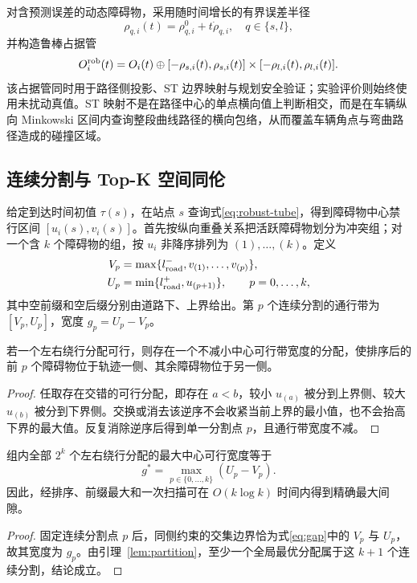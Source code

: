 对含预测误差的动态障碍物，采用随时间增长的有界误差半径
\begin{equation}
 \rho_{q,i}(t)=\rho_{q,i}^{0}+t\dot\rho_{q,i},\quad q\in\{s,l\},
\end{equation}
并构造鲁棒占据管
\begin{equation}
 O_i^{\rm rob}(t)=O_i(t)\oplus
 [-\rho_{s,i}(t),\rho_{s,i}(t)]\times[-\rho_{l,i}(t),\rho_{l,i}(t)].
 \label{eq:robust-tube}
\end{equation}
该占据管同时用于路径侧投影、ST 边界映射与规划安全验证；实验评价则始终使用未扰动真值。ST 映射不是在路径中心的单点横向值上判断相交，而是在车辆纵向 Minkowski 区间内查询整段曲线路径的横向包络，从而覆盖车辆角点与弯曲路径造成的碰撞区域。

\subsection{连续分割与 Top-K 空间同伦}

给定到达时间初值 $\tau(s)$，在站点 $s$ 查询式\eqref{eq:robust-tube}，得到障碍物中心禁行区间 $[u_i(s),v_i(s)]$。首先按纵向重叠关系把活跃障碍物划分为冲突组；对一个含 $k$ 个障碍物的组，按 $u_i$ 非降序排列为 $(1),\ldots,(k)$。定义
\begin{align}
 V_p&=\max\{l^-_{\rm road},v_{(1)},\ldots,v_{(p)}\},\\
 U_p&=\min\{l^+_{\rm road},u_{(p+1)}\},\qquad p=0,\ldots,k,
 \label{eq:gap}
\end{align}
其中空前缀和空后缀分别由道路下、上界给出。第 $p$ 个连续分割的通行带为 $[V_p,U_p]$，宽度 $g_p=U_p-V_p$。

\begin{lemma}[连续分割性质]
若一个左右绕行分配可行，则存在一个不减小中心可行带宽度的分配，使排序后的前 $p$ 个障碍物位于轨迹一侧、其余障碍物位于另一侧。
\label{lem:partition}
\end{lemma}
\begin{proof}
任取存在交错的可行分配，即存在 $a<b$，较小 $u_{(a)}$ 被分到上界侧、较大 $u_{(b)}$ 被分到下界侧。交换或消去该逆序不会收紧当前上界的最小值，也不会抬高下界的最大值。反复消除逆序后得到单一分割点 $p$，且通行带宽度不减。
\end{proof}

\begin{theorem}[最大间隙精确性]
组内全部 $2^k$ 个左右绕行分配的最大中心可行宽度等于
\begin{equation}
 g^*=\max_{p\in\{0,\ldots,k\}}(U_p-V_p).
\end{equation}
因此，经排序、前缀最大和一次扫描可在 $O(k\log k)$ 时间内得到精确最大间隙。
\label{thm:maxgap}
\end{theorem}
\begin{proof}
固定连续分割点 $p$ 后，同侧约束的交集边界恰为式\eqref{eq:gap}中的 $V_p$ 与 $U_p$，故其宽度为 $g_p$。由引理~\ref{lem:partition}，至少一个全局最优分配属于这 $k+1$ 个连续分割，结论成立。
\end{proof}

